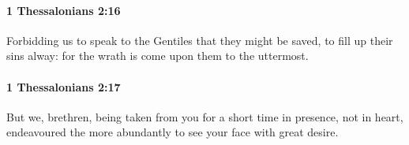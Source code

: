 		\paragraph{1 Thessalonians 2:16} %
			\label{1THESSALONIANS-2-16}

			Forbidding us to speak to the Gentiles that they might be saved, to fill up their sins alway: for the wrath is come upon them to the uttermost.

			\begin{framed}
			\scriptsize
				\begin{compactdesc}
					\item[SBLG] 
				\end{compactdesc}
			\end{framed}

		\paragraph{1 Thessalonians 2:17} %
			\label{1THESSALONIANS-2-17}

			But we, brethren, being taken from you for a short time in presence, not in heart, endeavoured the more abundantly to see your face with great desire.

